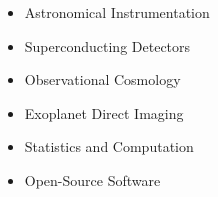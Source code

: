 \begin{multicols}{3}
\begin{itemize}
    \item Astronomical Instrumentation
    \item Superconducting Detectors
    \item Observational Cosmology
    \item Exoplanet Direct Imaging
    \item Statistics and Computation
    \item Open-Source Software
\end{itemize}
\end{multicols}